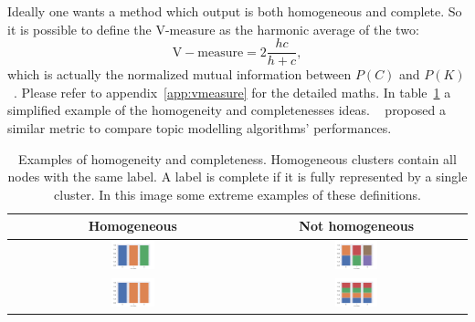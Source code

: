 Ideally one wants a method which output is both homogeneous and complete. So it is possible to define the V-measure as the harmonic average of the two:
\begin{equation}\label{eq:mutualinformation}
    \mathrm{V-measure}=2\frac{h c}{h + c},
\end{equation}
which is actually the normalized mutual information between $P(C)$ and $P(K)$~\cite{rosenberg2007v}. Please refer to appendix~\ref{app:vmeasure} for the detailed maths. In table~\ref{tab:topic/cartoon/hc_table} a simplified example of the homogeneity and completenesses ideas. ~\cite{Shi} proposed a similar metric to compare topic modelling algorithms' performances.
\begin{table}[htb!]
	\centering
	\begin{tabular}{|c|c|c|}
		\hline
		&Homogeneous & Not homogeneous\\ \hline
		\rotatebox[origin=l]{90}{Complete}&    \includegraphics[width=0.2\textwidth]{pictures/topic/cartoon/cartoon_hc.pdf}&\includegraphics[width=0.2\textwidth]{pictures/topic/cartoon/cartoon_c.pdf}  \\ \hline
		\rotatebox{90}{Not complete}&   \includegraphics[width=0.2\textwidth]{pictures/topic/cartoon/cartoon_h.pdf}&\includegraphics[width=0.2\textwidth]{pictures/topic/cartoon/cartoon.pdf} \\ \hline
	\end{tabular}
	\caption{Examples of homogeneity and completeness. Homogeneous clusters contain all nodes with the same label. A label is complete if it is fully represented by a single cluster. In this image some extreme examples of these definitions.}
	\label{tab:topic/cartoon/hc_table}
\end{table}
			
